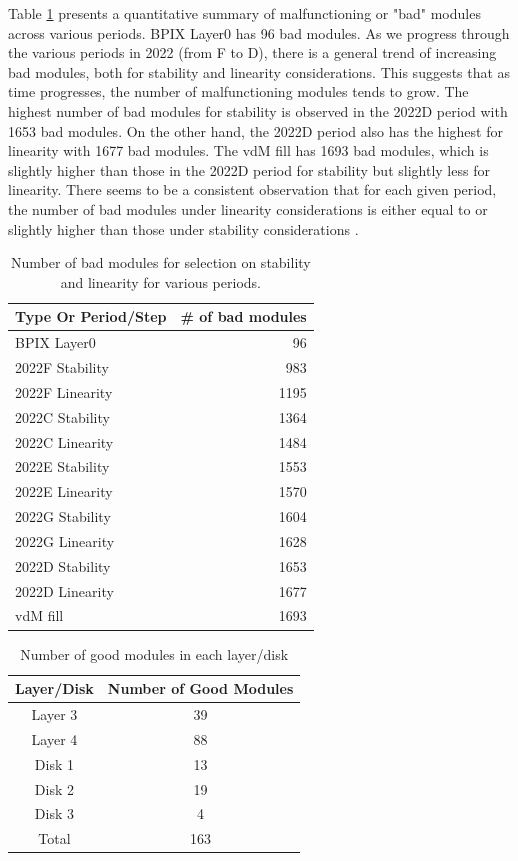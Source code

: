 Table \ref{tab:bad_modules} presents a quantitative summary of malfunctioning or "bad" modules across various periods. BPIX Layer0 has 96 bad modules. As we progress through the various periods in 2022 (from F to D), there is a general trend of increasing bad modules, both for stability and linearity considerations. This suggests that as time progresses, the number of malfunctioning modules tends to grow. The highest number of bad modules for stability is observed in the 2022D period with 1653 bad modules. On the other hand, the 2022D period also has the highest for linearity with 1677 bad modules. The vdM fill has 1693 bad modules, which is slightly higher than those in the 2022D period for stability but slightly less for linearity. There seems to be a consistent observation that for each given period, the number of bad modules under linearity considerations is either equal to or slightly higher than those under stability considerations \cite{pas_22}. %

\begin{table}[h]
  \centering
  \caption[Bad modules per period]{Number of bad modules for selection on stability and linearity for various periods.}
\begin{tabular}{lr}
\textbf{Type Or Period/Step} & \textbf{\# of bad modules} \\
\hline
BPIX Layer0 & 96 \\
2022F Stability & 983 \\
2022F Linearity & 1195 \\
2022C Stability & 1364 \\
2022C Linearity & 1484 \\
2022E Stability & 1553 \\
2022E Linearity & 1570 \\
2022G Stability & 1604 \\
2022G Linearity & 1628 \\
2022D Stability & 1653 \\
2022D Linearity & 1677 \\
vdM fill & 1693 \\
\end{tabular}
\label{tab:bad_modules}
\end{table}


\begin{table}
\centering
\caption{Number of good modules in each layer/disk}
\label{tab:2022ldmodules}
\begin{tabular}{cc}
\textbf{Layer/Disk} & \textbf{Number of Good Modules} \\
\hline
Layer 3 & 39 \\
Layer 4 & 88 \\
Disk 1 & 13 \\
Disk 2 &  19\\
Disk 3 &  4\\
Total & 163\\
\end{tabular}
\end{table}

